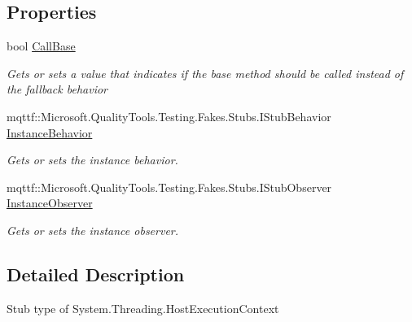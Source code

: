 \subsection*{Properties}
\begin{DoxyCompactItemize}
\item 
bool \hyperlink{class_system_1_1_threading_1_1_fakes_1_1_stub_host_execution_context_a85f94cd55cc53fc732d4918efb1a712a}{Call\-Base}
\begin{DoxyCompactList}\small\item\em Gets or sets a value that indicates if the base method should be called instead of the fallback behavior\end{DoxyCompactList}\item 
mqttf\-::\-Microsoft.\-Quality\-Tools.\-Testing.\-Fakes.\-Stubs.\-I\-Stub\-Behavior \hyperlink{class_system_1_1_threading_1_1_fakes_1_1_stub_host_execution_context_acc377becc917e178c57b3c96cb49ee3f}{Instance\-Behavior}
\begin{DoxyCompactList}\small\item\em Gets or sets the instance behavior.\end{DoxyCompactList}\item 
mqttf\-::\-Microsoft.\-Quality\-Tools.\-Testing.\-Fakes.\-Stubs.\-I\-Stub\-Observer \hyperlink{class_system_1_1_threading_1_1_fakes_1_1_stub_host_execution_context_a30cc3742424e64469263207f546cb127}{Instance\-Observer}
\begin{DoxyCompactList}\small\item\em Gets or sets the instance observer.\end{DoxyCompactList}\end{DoxyCompactItemize}


\subsection{Detailed Description}
Stub type of System.\-Threading.\-Host\-Execution\-Context




